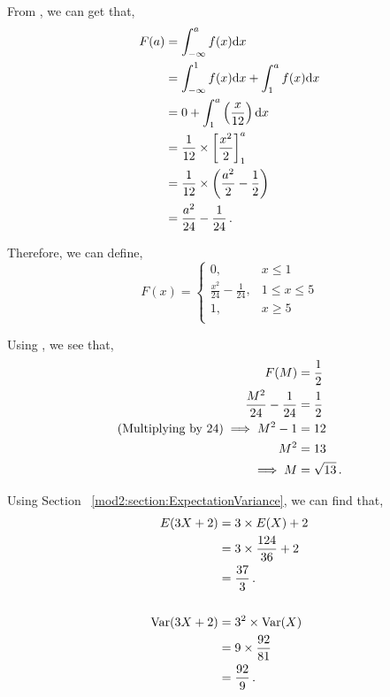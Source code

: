 \begin{subquestions}

\subquestion

From , we can get that,
\begin{align}
	F(a) & = \int_{-\infty}^{a} f(x)\mathrm{d}x \nonumber \\
		 & = \int_{-\infty}^{1} f(x)\mathrm{d}x+\int_{1}^{a} f(x)\mathrm{d}x \nonumber \\
	     & = 0 + \int_{1}^{a} \left(\frac{x}{12} \right)\mathrm{d}x \nonumber \\
	     & = \frac{1}{12} \times \left[ \frac{x^2}{2} \right]^a_1 \nonumber \\
	     & = \frac{1}{12} \times \left(\frac{a^2}{2} - \frac{1}{2}\right) \nonumber \\
	     & = \frac{a^2}{24} - \frac{1}{24} \,.
\end{align}

Therefore, we can define,
\[  F(x) = \begin{cases}
	 0, & x \leq 1 \\
	\frac{x^2}{24}-\frac{1}{24}, & 1\leq x\leq 5 \\
	1, & x\geq 5 \\ 
\end{cases}
\]


\subquestion

Using , we see that,
\begin{align}
	F(M) & = \frac{1}{2} \nonumber \\
	\frac{M^2}{24}-\frac{1}{24} & = \frac{1}{2} \nonumber \\
	\text{(Multiplying by 24)} \implies M^2 - 1 & = 12 \nonumber \\
	M^2 & = 13 \nonumber \\
	\implies M & = \sqrt{13} \,.
\end{align}


\subquestion

Using Section ~\ref{mod2:section:ExpectationVariance}, we can find that,
\begin{align}
	E(3X+2)	& = 3\times E(X) +2 \nonumber \\
	        & = 3 \times \frac{124}{36} + 2 \nonumber \\
	        & = \frac{37}{3} \,. \\ \nonumber \\
	 \text{Var}(3X+2) & = 3^2 \times \text{Var}(X) \nonumber \\
	                  & = 9  \times \frac{92}{81} \nonumber \\
	                  & = \frac{92}{9} \,.
\end{align}


\end{subquestions}
